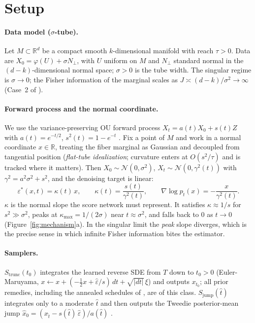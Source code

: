 \documentclass[11pt]{article}
\theoremstyle{remark}
\newcommand{\eps}{\varepsilon}
\newcommand{\epshat}{\hat\varepsilon}
\newcommand{\R}{\mathbb{R}}
\newcommand{\sigsq}{\sigma^2}
\begin{document}
\section{Setup}\label{sec:setup}

\paragraph{Data model ($\sigma$-tube).} Let $M\subset\R^d$ be a compact smooth
$k$-dimensional manifold with reach $\tau>0$. Data are
$X_0=\varphi(U)+\sigma N_\perp$, with $U$ uniform on $M$ and $N_\perp$ standard normal in
the $(d-k)$-dimensional normal space; $\sigma>0$ is the tube width. The singular regime
is $\sigma\to0$; the Fisher information of the marginal scales as
$J\asymp(d-k)/\sigsq\to\infty$ (Case~2 of \citealp{khelifa2026recursive}).

\paragraph{Forward process and the normal coordinate.} We use the
variance-preserving OU forward process $X_t=a(t)X_0+s(t)Z$ with $a(t)=e^{-t/2}$,
$s^2(t)=1-e^{-t}$ \citep{ho2020ddpm,song2021sde}. Fix a point of $M$ and work in a
normal coordinate $x\in\R$, treating the fiber marginal as Gaussian and decoupled from
tangential position (\emph{flat-tube idealization}; curvature enters at $O(s^2/\tau)$
and is tracked where it matters). Then
$X_0\sim\mathcal N(0,\sigsq)$, $X_t\sim\mathcal N(0,\gamma^2(t))$ with
$\gamma^2=a^2\sigsq+s^2$, and the denoising target is linear:
\begin{equation}
\eps^*(x,t)=\kappa(t)\,x,\qquad
\kappa(t)=\frac{s(t)}{\gamma^2(t)},\qquad
\nabla\log p_t(x)=-\frac{x}{\gamma^2(t)} .
\label{eq:kappa}
\end{equation}
$\kappa$ is the normal slope the score network must represent. It satisfies
$\kappa\approx1/s$ for $s^2\gg\sigsq$, peaks at $\kappa_{\max}=1/(2\sigma)$ near
$t\approx\sigsq$, and falls back to $0$ as $t\to0$ (Figure~\ref{fig:mechanism}a). In the
singular limit the \emph{peak} slope diverges, which is the precise sense in which infinite
Fisher information bites the estimator.

\paragraph{Samplers.} $S_{\mathrm{trunc}}(t_0)$ integrates the learned reverse SDE
from $T$ down to $t_0>0$ (Euler-Maruyama,
$x\leftarrow x+(-\tfrac12x+\epshat/s)\,dt+\sqrt{|dt|}\,\xi$) and outputs $x_{t_0}$; all
prior remedies, including the annealed schedules of \citet{khelifa2026recursive}, are of
this class. $S_{\mathrm{jump}}(\hat t)$ integrates only to a moderate $\hat t$ and then
outputs the Tweedie posterior-mean jump
$\hat x_0=(x_{\hat t}-s(\hat t)\,\epshat)/a(\hat t)$
\citep{efron2011tweedie,beyler2025optimal}.
\end{document}
